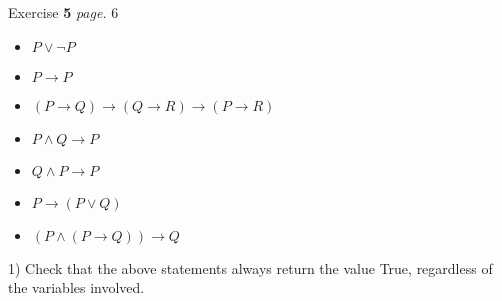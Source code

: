 \documentclass[11pt]{article}
\newcommand{\problem
}[2]{
\begin{mdframed}
    Exercise \textbf{#1} \hfill \emph{page. }#2
\end{mdframed}
}
\begin{document}
\problem{5}{6}
\begin{itemize}
	\item $P \vee \neg P$
	\item $P \rightarrow P$
	\item $(P \rightarrow Q) \rightarrow(Q \rightarrow R) \rightarrow(P \rightarrow R)$
	\item $P \wedge Q \rightarrow P$
	\item $Q \wedge P \rightarrow P$
	\item $P \rightarrow(P \vee Q)$
	\item $(P \wedge(P \rightarrow Q)) \rightarrow Q$
\end{itemize}
1) Check that the above statements always return the value True, regardless of the variables involved. \\
\end{document}

